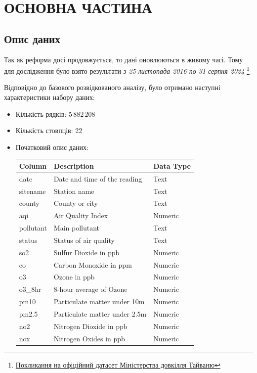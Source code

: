 \documentclass[./report.tex]{subfiles}
\begin{document}
\section{ОСНОВНА ЧАСТИНА}
\subsection{Опис даних}
Так як реформа досі продовжується, то дані оновлюються в живому часі. 
Тому для дослідження було взято результати \textit{з 25 листопада 2016 по 31 серпня 2024}
\footnote{\href{https://data.moenv.gov.tw/en/dataset/detail/aqx_p_488}{Покликання на офіційний датасет Міністерства довкілля Тайваню}}

Відповідно до базового розвідкованого аналізу, було отримано наступні характеристики набору даних: 

\begin{itemize}
    \item Кількість рядків: 5\,882\,208
    \item Кількість стовпців: 22
    \item Початковий опис даних: 
    \begin{table}[h!]
\centering
\begin{tabular}{|>{\raggedright\arraybackslash}p{3cm}|p{5cm}|p{3cm}|}
\hline
\textbf{Column} & \textbf{Description} & \textbf{Data Type} \\
\hline
date & Date and time of the reading & Text \\
\hline
sitename & Station name & Text \\
\hline
county & County or city & Text \\
\hline
aqi & Air Quality Index & Numeric \\
\hline
pollutant & Main pollutant & Text \\
\hline
status & Status of air quality & Text \\
\hline
so2 & Sulfur Dioxide in ppb & Numeric \\
\hline
co & Carbon Monoxide in ppm & Numeric \\
\hline
o3 & Ozone in ppb & Numeric \\
\hline
o3\_8hr & 8-hour average of Ozone & Numeric \\
\hline
pm10 & Particulate matter under 10m & Numeric \\
\hline
pm2.5 & Particulate matter under 2.5m & Numeric \\
\hline
no2 & Nitrogen Dioxide in ppb & Numeric \\
\hline
nox & Nitrogen Oxides in ppb & Numeric \\

\end{tabular}
\end{table}
\end{itemize}
\end{document}

